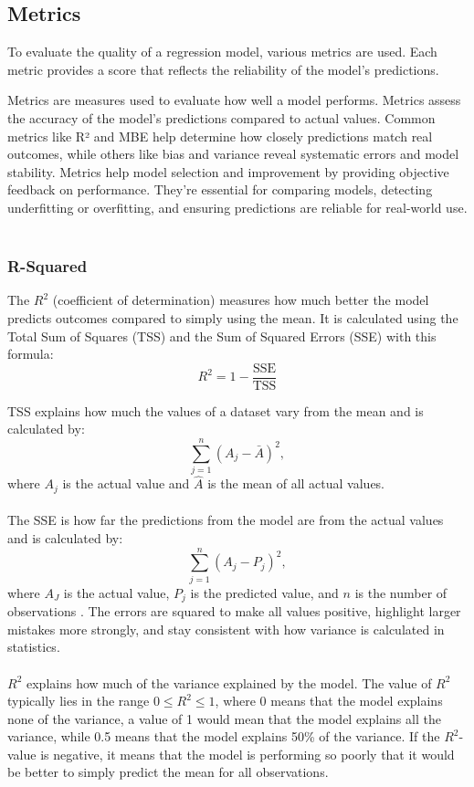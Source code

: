 \subsection{Metrics}
To evaluate the quality of a regression model, various metrics are used. Each metric provides a score that reflects the reliability of the model's predictions.

Metrics are measures used to evaluate how well a model performs. Metrics assess the accuracy of the model’s predictions compared to actual values. Common metrics like R² and MBE help determine how closely predictions match real outcomes, while others like bias and variance reveal systematic errors and model stability. Metrics help model selection and improvement by providing objective feedback on performance. They’re essential for comparing models, detecting underfitting or overfitting, and ensuring predictions are reliable for real-world use.
\\\\

\subsubsection{R-Squared}
The $R^2$ (coefficient of determination) measures how much better the model predicts outcomes compared to simply using the mean. It is calculated using the Total Sum of Squares (TSS) and the Sum of Squared Errors (SSE) with this formula: 
\begin{equation}
R^2=1-\frac{\text{SSE}}{\text{TSS}}
\end{equation}

TSS explains how much the values of a dataset vary from the mean and is calculated by: 
\begin{equation}
\sum_{j=1}^{n}(A_j - \bar{A})^2,
\end{equation}
where $A_j$ is the actual value and $\hat{A}$ is the mean of all actual values.
\\\\

\noindent The SSE is how far the predictions from the model are from the actual values and is calculated by:
\begin{equation}
	\sum_{j=1}^{n}(A_j - P_j)^2,
\end{equation}
where $A_J$ is the actual value, $P_j$ is the predicted value, and $n$ is the number of observations \cite{metrics}. The errors are squared to make all values positive, highlight larger mistakes more strongly, and stay consistent with how variance is calculated in statistics.
\\\\
$R^2$ explains how much of the variance explained by the model. The value of $R^2$ typically lies in the range $0 \leq R^2 \leq 1$, where 0 means that the model explains none of the variance, a value of 1 would mean that the model explains all the variance, while 0.5 means that the model explains 50\% of the variance. If the $R^2$-value is negative, it means that the model is performing so poorly that it would be better to simply predict the mean for all observations.

